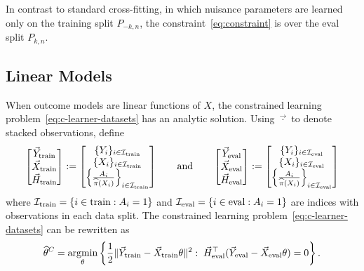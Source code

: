 In contrast to standard cross-fitting, in which nuisance parameters are learned only on the training split $P_{-k,n}$, 
the constraint~\eqref{eq:constraint} is over the eval split $P_{k,n}$. 

\subsection{Linear Models}
\label{sec:methods_linear}
When outcome models are linear functions of $X$, the
constrained learning problem~\eqref{eq:c-learner-datasets} 
has an analytic solution.
Using $\vec{\cdot}$ to denote stacked observations, define
\vspace{-0.3em}
\begin{equation*}
\begin{bmatrix}
\vec{Y}_{\rm train}  \\
\vec{X}_{\rm train} \\
\vec{H}_{\rm train} 
\end{bmatrix}
:= \begin{bmatrix}
\{Y_i\}_{i \in \mathcal{I}_{\rm train}}  \\
\{X_i\}_{i \in \mathcal{I}_{\rm train}} \\
\left\{ \frac{A_i}{\widehat{\pi}(X_i)} 
\right\}_{i \in \mathcal{I}_{\rm train}}
\end{bmatrix}
\qquad \mbox{and} \qquad
\begin{bmatrix}
\vec{Y}_{\rm eval}  \\
\vec{X}_{\rm eval} \\
\vec{H}_{\rm eval} 
\end{bmatrix}
:= \begin{bmatrix}
\{Y_i\}_{i \in \mathcal{I}_{\rm eval}}  \\
\{X_i\}_{i \in \mathcal{I}_{\rm eval}} \\
\left\{ \frac{A_i}{\widehat{\pi}(X_i)} 
\right\}_{i \in \mathcal{I}_{\rm eval}}
\end{bmatrix}
\end{equation*}
where $\mathcal{I}_{\rm train} = \{i \in \mbox{train}: A_i = 1\}$
and $\mathcal{I}_{\rm eval} = \{i \in \mbox{eval}: A_i = 1\}$ 
are indices with observations in each data split.
The constrained learning problem~\eqref{eq:c-learner-datasets} 
can be rewritten as \vspace{-1.5em}\begin{align*}
\widehat{\theta}^C 
    = \mathop{\rm argmin}_\theta \left\{
\frac{1}{2}\|\vec{Y}_{\rm train} - \vec{X}_{\rm train} \theta\|^2:\; 
\vec{H}_{\rm eval}^\top (\vec{Y}_{\rm eval} - \vec{X}_{\rm eval} \theta)=0 \right\}.
\end{align*}
